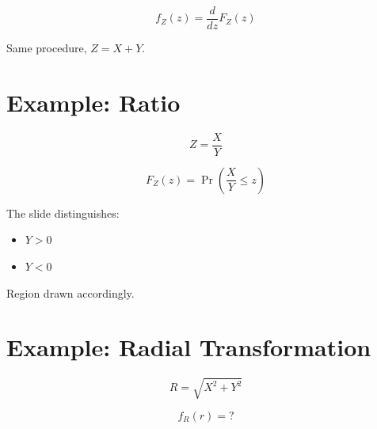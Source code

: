 \documentclass[12pt]{article}
\begin{document}
\[
f_Z(z)=\frac{d}{dz}F_Z(z)
\]

Same procedure, \( Z = X + Y \).

\section{Example: Ratio}

\[
Z=\frac{X}{Y}
\]

\[
F_Z(z)=\Pr\left(\frac{X}{Y} \le z\right)
\]

The slide distinguishes:

\begin{itemize}
    \item \( Y>0 \)
    \item \( Y<0 \)
\end{itemize}

Region drawn accordingly.

\section{Example: Radial Transformation}

\[
R=\sqrt{X^2+Y^2}
\]

\[
f_R(r)=?
\]
\end{document}
